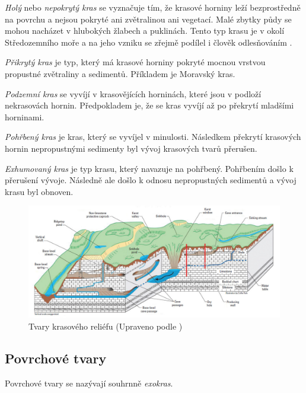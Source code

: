 \emph{Holý} nebo \emph{nepokrytý kras} se vyznačuje tím, že krasové horniny leží bezprostředně na povrchu a nejsou pokryté ani zvětralinou ani vegetací. Malé zbytky půdy se mohou nacházet v hlubokých žlabech a puklinách. Tento typ krasu je v okolí Středozemního moře a na jeho vzniku se zřejmě podílel i člověk odlesňováním \parencite{demekObecnaGeomorfologie1987}. 

\emph{Přikrytý kras} je typ, který má krasové horniny pokryté mocnou vrstvou propustné zvětraliny a sedimentů. Příkladem je Moravský kras.

\emph{Podzemní kras} se vyvíjí v krasovějících horninách, které jsou v podloží nekrasovách hornin. Předpokladem je, že se kras vyvíjí až po překrytí mladšími horninami.

\emph{Pohřbený kras} je kras, který se vyvíjel v minulosti. Následkem překrytí krasových hornin nepropustnými sedimenty byl vývoj krasových tvarů přerušen.

\emph{Exhumovaný kras} je typ krasu, který navazuje na pohřbený. Pohřbením došlo k přerušení vývoje. Následně ale došlo k odnosu nepropustných sedimentů a vývoj krasu byl obnoven.

\begin{figure}[h]
	\centering
	\includegraphics[width=\linewidth]{obrazky/karst/KarstterrainUSGS}
	\caption{Tvary krasového reliéfu (Upraveno podle \textcite{currensGeneralizedBlockDiagram2001})}
	\label{fig:karstterrainusgs}
\end{figure}

\subsection{Povrchové tvary}
Povrchové tvary se nazývají souhrnně \emph{exokras}. 

